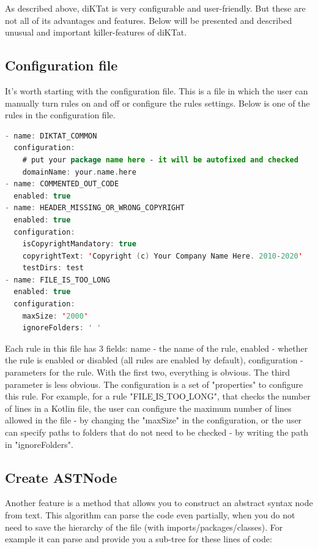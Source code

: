 \par As described above, diKTat is very configurable and user-friendly. But these are not all of its advantages and features. Below will be presented and described unusual and important killer-features of diKTat.

\subsection{Configuration file}
\par
It's worth starting with the configuration file. This is a file in which the user can manually turn rules on and off or configure the rules settings. Below is one of the rules in the configuration file.
\\
\begin{lstlisting}[caption={Part of configuration file.},
label={lst:example1}, language=Kotlin]
- name: DIKTAT_COMMON
  configuration:
    # put your package name here - it will be autofixed and checked
    domainName: your.name.here
- name: COMMENTED_OUT_CODE
  enabled: true
- name: HEADER_MISSING_OR_WRONG_COPYRIGHT
  enabled: true
  configuration:
    isCopyrightMandatory: true
    copyrightText: 'Copyright (c) Your Company Name Here. 2010-2020'
    testDirs: test
- name: FILE_IS_TOO_LONG
  enabled: true
  configuration:
    maxSize: '2000'
    ignoreFolders: ' '
\end{lstlisting}
Each rule in this file has 3 fields: name - the name of the rule, enabled - whether the rule is enabled or disabled (all rules are enabled by default), configuration - parameters for the rule. With the first two, everything is obvious. The third parameter is less obvious. The configuration is a set of "properties" to configure this rule. For example, for a rule "FILE\underline{ }IS\underline{ }TOO\underline{ }LONG", that checks the number of lines in a Kotlin file, the user can configure the maximum number of lines allowed in the file - by changing the "maxSize" in the configuration, or the user can specify paths to folders that do not need to be checked - by writing the path in "ignoreFolders". \\

\subsection{Create ASTNode}
\par
Another feature is a method that allows you to construct an abstract syntax node from text. This algorithm can parse the code even partially, when you do not need to save the hierarchy of the file (with imports/packages/classes).
For example it can parse and provide you a sub-tree for these lines of code:

